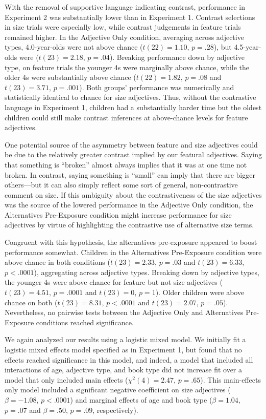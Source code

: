 \documentclass[man]{apa2}
\begin{document}
With the removal of supportive language indicating contrast, performance in Experiment 2 was substantially lower than in Experiment 1. Contrast selections in size trials were especially low, while contrast judgements in feature trials remained higher. In the Adjective Only condition, averaging across adjective types, 4.0-year-olds were not above chance ($t(22) = 1.10$, $p = .28$), but 4.5-year-olds were ($t(23)=2.18$, $p = .04$). Breaking performance down by adjective type, on feature trials the younger 4s were marginally above chance, while the older 4s were substantially above chance ($t(22) = 1.82$, $p = .08$ and $t(23)=3.71$, $p = .001$). Both groups' performance was numerically and statistically identical to chance for size adjectives. Thus, without the contrastive language in Experiment 1, children had a substantially harder time but the oldest children could still make contrast inferences at above-chance levels for feature adjectives. 

One potential source of the asymmetry between feature and size adjectives could be due to the relatively greater contrast implied by our featural adjectives. Saying that something is ``broken'' almost always implies that it was at one time not broken. In contrast, saying something is ``small'' can imply that there are bigger others---but it can also simply reflect some sort of general, non-contrastive comment on size. If this ambiguity about the contrastiveness of the size adjectives was the source of the lowered performance in the Adjective Only condition, the Alternatives Pre-Exposure condition might increase performance for size adjectives by virtue of highlighting the contrastive use of alternative size terms. 

Congruent with this hypothesis, the alternatives pre-exposure appeared to boost performance somewhat. Children in the Alternatives Pre-Exposure condition were above chance in both conditions ($t(23) = 2.33$, $p = .03$ and $t(23) = 6.33$, $p < .0001$), aggregating across adjective types. Breaking down by adjective types, the younger 4s were above chance for feature but not size adjectives ($t(23) = 4.51$, $p = .0001$ and $t(23)=0$, $p = 1$). Older children were above chance on both ($t(23) = 8.31$, $p < .0001$ and $t(23)= 2.07$, $p = .05$). Nevertheless, no pairwise tests between the Adjective Only and Alternatives Pre-Exposure conditions reached significance. 

We again analyzed our results using a logistic mixed model. We initially fit a logistic mixed effects model specified as in Experiment 1, but found that no effects reached significance in this model, and indeed, a model that included all interactions of age, adjective type, and book type did not increase fit over a model that only included main effects ($\chi^2(4) = 2.47$, $p = .65$). This main-effects only model included a significant negative coefficient on size adjectives ($\beta = -1.08$, $p < .0001$) and marginal effects of age and book type ($\beta = 1.04$, $p = .07$ and $\beta = .50$, $p = .09$, respectively). 
\end{document}
